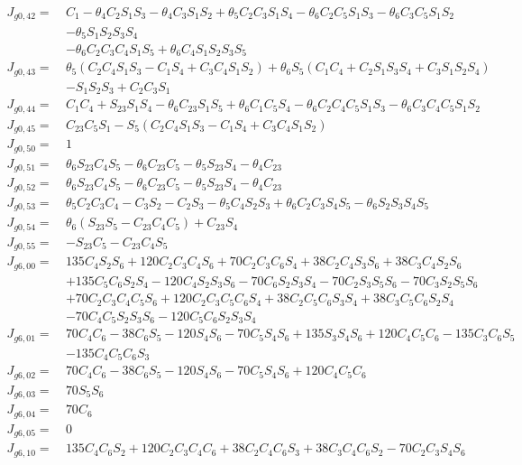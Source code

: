 \documentclass[12pt]{article}
\begin{document}
\begin{CJK}{UTF8}{bsmi}
\begin{equation*}
\begin{split}
J_{g0,42} =\  &C_1 - \theta _4C_2S_1S_3 - \theta _4C_3S_1S_2 + \theta _5C_2C_3S_1S_4 - \theta _6C_2C_5S_1S_3 - \theta _6C_3C_5S_1S_2\\
			  & - \theta _5S_1S_2S_3S_4\\
		 	  &- \theta _6C_2C_3C_4S_1S_5 + \theta _6C_4S_1S_2S_3S_5\\
J_{g0,43} =\  &\theta _5(C_2C_4S_1S_3 - C_1S_4 + C_3C_4S_1S_2) + \theta _6S_5(C_1C_4 + C_2S_1S_3S_4 + C_3S_1S_2S_4)\\
		 	  &- S_1S_2S_3 + C_2C_3S_1\\
J_{g0,44} =\  &C_1C_4 + S_{23}S_1S_4 - \theta _6C_{23}S_1S_5 + \theta _6C_1C_5S_4 - \theta _6C_2C_4C_5S_1S_3 - \theta _6C_3C_4C_5S_1S_2\\
J_{g0,45} =\  &C_{23}C_5S_1 - S_5(C_2C_4S_1S_3 - C_1S_4 + C_3C_4S_1S_2)\\
J_{g0,50} =\  &1\\
J_{g0,51} =\  &\theta _6S_{23}C_4S_5 - \theta _6C_{23}C_5 - \theta _5S_{23}S_4 - \theta _4C_{23}\\
J_{g0,52} =\  &\theta _6S_{23}C_4S_5 - \theta _6C_{23}C_5 - \theta _5S_{23}S_4 - \theta _4C_{23}\\
J_{g0,53} =\  &\theta _5C_2C_3C_4 - C_3S_2 - C_2S_3 - \theta _5C_4S_2S_3 + \theta _6C_2C_3S_4S_5 - \theta _6S_2S_3S_4S_5\\
J_{g0,54} =\  &\theta _6(S_{23}S_5 - C_{23}C_4C_5) + C_{23}S_4\\
J_{g0,55} =\  &- S_{23}C_5 - C_{23}C_4S_5\\
J_{g6,00} =\  &135C_4S_2S_6 + 120C_2C_3C_4S_6 + 70C_2C_3C_6S_4 + 38C_2C_4S_3S_6 + 38C_3C_4S_2S_6\\
			  &+ 135C_5C_6S_2S_4 - 120C_4S_2S_3S_6 - 70C_6S_2S_3S_4 - 70C_2S_3S_5S_6 - 70C_3S_2S_5S_6\\
			  &+ 70C_2C_3C_4C_5S_6 + 120C_2C_3C_5C_6S_4 + 38C_2C_5C_6S_3S_4 + 38C_3C_5C_6S_2S_4\\
			  &- 70C_4C_5S_2S_3S_6 - 120C_5C_6S_2S_3S_4\\
J_{g6,01} =\  &70C_4C_6 - 38C_6S_5 - 120S_4S_6 - 70C_5S_4S_6 + 135S_3S_4S_6 + 120C_4C_5C_6 - 135C_3C_6S_5\\
			  &- 135C_4C_5C_6S_3\\   
J_{g6,02} =\  &70C_4C_6 - 38C_6S_5 - 120S_4S_6 - 70C_5S_4S_6 + 120C_4C_5C_6\\
J_{g6,03} =\  &70S_5S_6\\
J_{g6,04} =\  &70C_6\\
J_{g6,05} =\  &0\\
J_{g6,10} =\  &135C_4C_6S_2 + 120C_2C_3C_4C_6 + 38C_2C_4C_6S_3 + 38C_3C_4C_6S_2 - 70C_2C_3S_4S_6\\

\end{split}
\end{equation*}
\end{CJK}
\end{document}

